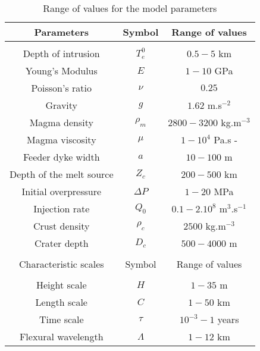 \begin{article}
\begin{enumerate}
	\begin{table}
	\caption{Range of values for the model parameters}
	\centering
	 \begin{tabular}{c|c|c}
	 \hline
	 Parameters& Symbol & Range of values \\
	 \hline
	 &&\\
	 Depth of intrusion & $T_{e}^0$ & $0.5-5$ km \\
	 Young's Modulus & $E$ & $1-10$ GPa \\
	 Poisson's ratio & $\nu$ & $0.25$ \\
	 Gravity & $g$ & $1.62$ m.s$^{-2}$ \\
	 Magma density & $\rho_{m}$ & $2800-3200$ kg.m$^{-3}$ \\
	 Magma viscosity & $\mu $ & $1-10^{4}$ Pa.s -\\
	 Feeder dyke width & $ a$ & $10-100$ m \\
	Depth of the melt source & $Z_{c}$ & $ 200-500$ km \\ 
	Initial overpressure & $\Delta P$ & $1-20$ MPa \\
	Injection rate & $Q_{0}$ &$0.1-2.10^8$ m$^{3}$.s$^{-1}$ \\
	Crust density & $\rho_{c}$ & $2500$ kg.m$^{-3}$ \\
	Crater depth & $D_{c}$ & $500-4000$ m \\
	&&\\
	\hline
	 Characteristic scales & Symbol & Range of values \\
	 \hline
	 &&\\
	Height scale & $H$& $1-35$ m \\
	Length scale & $C$    & $1-50$ km \\
	Time scale & $\tau$ & $10^{-3}-1$ years \\
	Flexural wavelength & $\Lambda$ & $1-12$ km 
	 \label{tab2}
	\end{tabular} 
	 \end{table}
	 

\end{enumerate}
\end{article}
